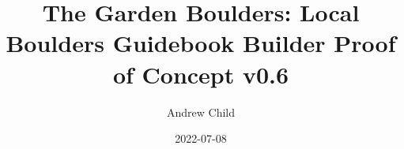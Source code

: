 \documentclass[10pt]{report}
\begin{document}
\title{The Garden Boulders: Local Boulders Guidebook Builder Proof of Concept v0.6}
\author{Andrew Child}
\date{2022-07-08}
\maketitle

\newcommand\chapterColor{MidnightBlue}

\twocolumn
\renewcommand\chapterColor{BrickRed}

\renewcommand\chapterColor{BurntOrange}

\renewcommand\chapterColor{PineGreen}

\renewcommand\chapterColor{RoyalPurple}

\renewcommand\chapterColor{Aquamarine}

\end{document}
